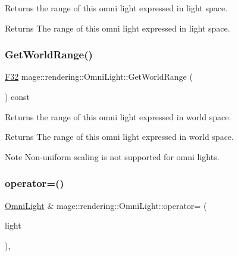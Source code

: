 Returns the range of this omni light expressed in light space.

\begin{DoxyReturn}{Returns}
The range of this omni light expressed in light space. 
\end{DoxyReturn}
\hypertarget{classmage_1_1rendering_1_1_omni_light_a7be27af3b3e5d11806396ce8f619223f}{}\label{classmage_1_1rendering_1_1_omni_light_a7be27af3b3e5d11806396ce8f619223f} 
\subsubsection{\texorpdfstring{Get\+World\+Range()}{GetWorldRange()}}
{\footnotesize\ttfamily \hyperlink{namespacemage_aa97e833b45f06d60a0a9c4fc22ae02c0}{F32} mage\+::rendering\+::\+Omni\+Light\+::\+Get\+World\+Range (\begin{DoxyParamCaption}{ }\end{DoxyParamCaption}) const\hspace{0.3cm}{\ttfamily [noexcept]}}

Returns the range of this omni light expressed in world space.

\begin{DoxyReturn}{Returns}
The range of this omni light expressed in world space. 
\end{DoxyReturn}
\begin{DoxyNote}{Note}
Non-\/uniform scaling is not supported for omni lights. 
\end{DoxyNote}
\hypertarget{classmage_1_1rendering_1_1_omni_light_aac914061f6798131e7f59275b4716b48}{}\label{classmage_1_1rendering_1_1_omni_light_aac914061f6798131e7f59275b4716b48} 
\subsubsection{\texorpdfstring{operator=()}{operator=()}\hspace{0.1cm}{\footnotesize\ttfamily [1/2]}}
{\footnotesize\ttfamily \hyperlink{classmage_1_1rendering_1_1_omni_light}{Omni\+Light} \& mage\+::rendering\+::\+Omni\+Light\+::operator= (\begin{DoxyParamCaption}\item[{const \hyperlink{classmage_1_1rendering_1_1_omni_light}{Omni\+Light} \&}]{light }\end{DoxyParamCaption})\hspace{0.3cm}{\ttfamily [default]}, {\ttfamily [noexcept]}}


